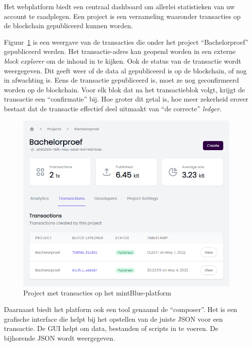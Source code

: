 Het webplatform biedt een centraal dashboard om allerlei statistieken van uw account te raadplegen. Een project is een verzameling waaronder transacties op de blockchain gepubliceerd kunnen worden.

Figuur~\ref{fig:mintblue-project} is een weergave van de transacties die onder het project ``Bachelorproef'' gepubliceerd werden. Het transactie-adres kan geopend worden in een externe \textit{block explorer} om de inhoud in te kijken.
Ook de status van de transactie  wordt weergegeven. Dit geeft weer of de data al gepubliceerd is op de blockchain, of nog in afwachting is. Eens de transactie gepubliceerd is, moet ze nog geconfirmeerd worden op de blockchain. Voor elk blok dat na het transactieblok volgt, krijgt de transactie een ``confirmatie'' bij. Hoe groter dit getal is, hoe meer zekerheid erover bestaat dat de transactie effectief deel uitmaakt van ``de correcte'' \textit{ledger}.

\begin{figure}[H]
	\centering
	\includegraphics[width=\linewidth]{img/proof-of-concept/mintblue-project.png}
	\caption{\label{fig:mintblue-project}Project met transacties op het mintBlue-platform}
\end{figure}

Daarnaast biedt het platform ook een tool genaamd de ``composer''. Het is een grafische interface die helpt bij het opstellen van de juiste JSON voor een transactie. De GUI helpt om data, bestanden of scripts in te voeren. De bijhorende JSON wordt weergegeven.


